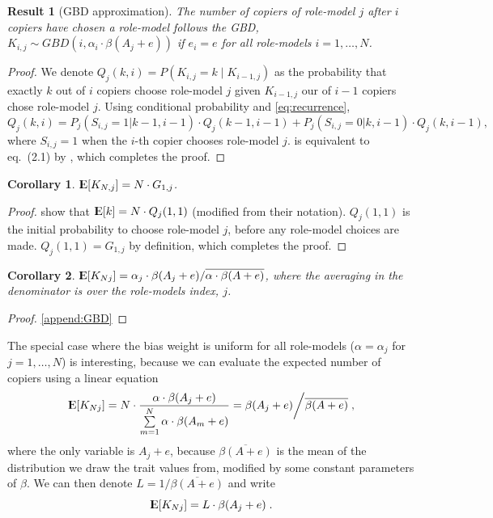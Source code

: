 \documentclass[12pt]{extarticle}
\DeclareMathOperator*{\E}{{\rm I\kern-.3em E}}
\newtheorem{corollary}{Corollary}
\newtheorem{result}{Result}
\begin{document}
\begin{result}[GBD approximation]\label{res:GBD}
The number of copiers of role-model $j$ after $i$ copiers have chosen a role-model follows the GBD, $K_{i,j} \sim GBD(i,\alpha_i\cdot\beta(A_j+e))$ if $e_i=e$ for all role-models $i=1, \ldots, N$. 
\end{result}

\begin{proof}
We denote $Q_j(k,i)=P(K_{i,j} = k \mid K_{i-1,j})$ as the probability that exactly $k$ out of $i$ copiers choose role-model $j$ given $K_{i-1,j}$ our of $i-1$ copiers chose role-model $j$. 
Using conditional probability and \cref{eq:recurrence},
\begin{equation}\label{recursive}
Q_j(k,i) = P_j(S_{i,j}=1 | k-1,i-1) \cdot Q_j(k-1,i-1) + P_j(S_{i,j} =0 | k,i-1) \cdot Q_j(k,i-1),
\end{equation}
where $S_{i,j} =1 $ when the $i$-th copier chooses role-model $j$.
 is equivalent to eq.~(2.1) by \citet{GBD}, which completes the proof.
\end{proof}

\begin{corollary}
$\E[K_{N,j}] = N \cdot G_{1,j}$.
\end{corollary}

\begin{proof}
\citet[eq.~(2.3)]{GBD} show that 
$\E[k] = N \cdot Q_j(1,1)$ (modified from their notation).
$Q_j(1,1)$ is the initial probability to choose role-model $j$, before any role-model choices are made.
$Q_j(1,1) = G_{1,j}$ by definition, which completes the proof.
\end{proof}

\begin{corollary}\label{cor:GBD}
$\E[K_{Nj}] = \alpha_j \cdot \beta(A_j+e) / \overline{\alpha \cdot \beta(A+e)}$, where the averaging in the denominator is over the role-models index, $j$.
\end{corollary}

\begin{proof}\cref{append:GBD}
\end{proof}

The special case where the bias weight is uniform for all role-models ($\alpha = \alpha_j$ for $j=1,\ldots, N$) is interesting, because we can evaluate the expected number of copiers using a linear equation
\begin{equation}
\E[K_{Nj}]= N\cdot\frac{\alpha\cdot\beta(A_j+e)}{\sum\limits_{m=1}^{N}\alpha\cdot\beta(A_m+e)} =\beta(A_j+e) \bigg/ \overline{\beta(A+e)} \;,
\end{equation}
where the only variable is $A_j+e$, because $\overline{\beta(A+e)}$ is the mean of the distribution we draw the trait values from, modified by some constant parameters of $\beta$.
We can then denote $L = 1/\overline{\beta(A+e)}$ and write
\begin{equation}\label{eq:linearEq}
\E[K_{Nj}] = L\cdot \beta(A_j+e) \;.
\end{equation}
\end{document}
